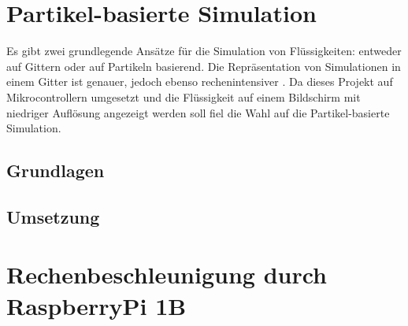 
\section{Partikel-basierte Simulation}
Es gibt zwei grundlegende Ansätze für die Simulation von Flüssigkeiten: entweder auf Gittern oder auf Partikeln basierend. Die Repräsentation von Simulationen in einem Gitter ist genauer, jedoch ebenso rechenintensiver \cite{fluid.tutorial_paper}. Da dieses Projekt auf Mikrocontrollern umgesetzt und die Flüssigkeit auf einem Bildschirm mit niedriger Auflösung angezeigt werden soll fiel die Wahl auf die Partikel-basierte Simulation.

\subsection{Grundlagen}

\subsection{Umsetzung}

\section{Rechenbeschleunigung durch RaspberryPi 1B}